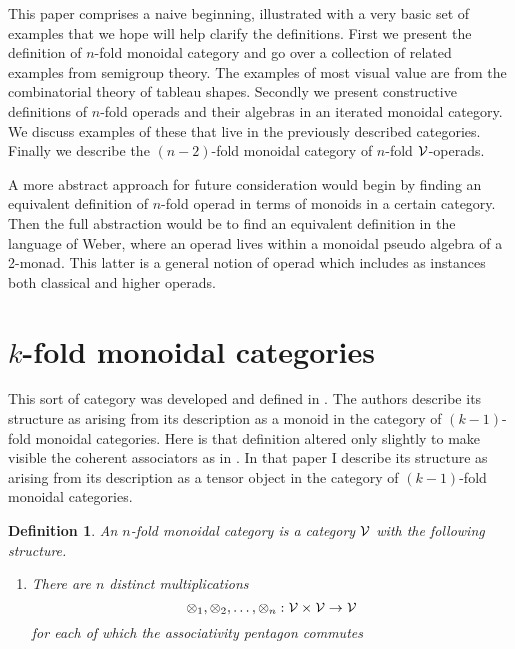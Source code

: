 \documentclass{tac}
\newtheorem{definition}{Definition}
\newcommand{\MySection}[1]
{\section{ #1}}
\begin{document}
{            This paper comprises a naive beginning, illustrated with a very basic set of examples that we hope
            will help clarify the definitions. First we present the definition of $n$-fold monoidal
            category and go over a collection of related examples from semigroup theory. The examples of most
            visual value are from the combinatorial theory of tableau shapes. Secondly
            we present constructive definitions of $n$-fold operads and their algebras in an iterated monoidal category.
 We discuss examples of these that live in the previously described categories. Finally we describe 
 the $(n-2)$-fold monoidal category of $n$-fold ${\cal V}$-operads. 
 
 A more abstract approach for future consideration would begin by finding an equivalent definition of 
 $n$-fold operad in terms of monoids in a certain category. Then the full abstraction would be to
 find an equivalent definition in the language of Weber, where an operad lives within a 
 monoidal pseudo algebra of a 2-monad. \cite{web} This latter is a general notion of operad which includes as instances
 both classical and higher
 operads.

            
            
    
    \clearpage
          \newpage
        \MySection{$k$-fold monoidal categories}
      This sort of category was
    developed and defined in \cite{Balt}. The authors describe its structure as arising from its description
    as a monoid in the
        category of $(k-1)$-fold monoidal categories. Here is that definition altered only slightly 
    to make visible the coherent associators as in \cite{forcey1}. In that paper I describe its structure as 
    arising from its description
    as a tensor object in the
        category of $(k-1)$-fold monoidal categories.
        
\begin{definition}\label{iterated} An $n${\it -fold monoidal category} is a category ${\cal V}$
          with the following structure. 
          \begin{enumerate}
          \item There are $n$ distinct multiplications
          $$\otimes_1,\otimes_2,\dots, \otimes_n:{\cal V}\times{\cal V}\to{\cal V}$$
          for each of which the associativity pentagon commutes
          

\end{enumerate}
\end{definition}}
\end{document}
